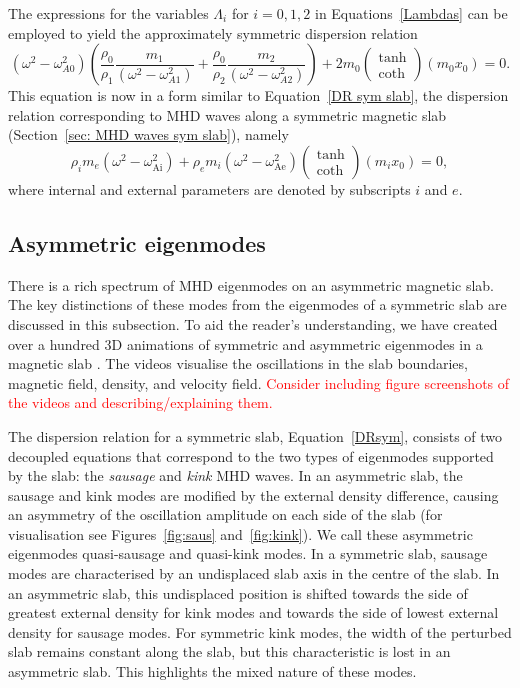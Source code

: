 \documentclass[12pt]{../style-files/ociamthesis}
\begin{document}
The expressions for the variables $\Lambda_i$ for $i=0,1,2$ in Equations~\eqref{Lambdas} can be employed to yield the approximately symmetric dispersion relation
\begin{equation}
(\omega^2 - \omega_{A0}^2)\left(\frac{\rho_0}{\rho_1}\frac{m_1}{(\omega^2 - \omega_{A1}^2)} + \frac{\rho_0}{\rho_2}\frac{m_2}{(\omega^2 - \omega_{A2}^2)}\right) + 2m_0\left(\begin{matrix}\tanh \\ \coth \end{matrix}\right)(m_0x_0) = 0. \label{DR approx}
\end{equation}
This equation is now in a form similar to Equation~\eqref{DR sym slab}, the dispersion relation corresponding to MHD waves along a symmetric magnetic slab (Section~\ref{sec: MHD waves sym slab}), namely
\begin{equation}
\rho_im_e(\omega^2 - \omega_\textrm{Ai}^2) + \rho_em_i(\omega^2 - \omega_\textrm{Ae}^2)\left(\begin{matrix}\tanh \\ \coth \end{matrix}\right)(m_ix_0) = 0, \label{DRsym}
\end{equation}
where internal and external parameters are denoted by subscripts $i$ and $e$.


\subsection{Asymmetric eigenmodes}
There is a rich spectrum of MHD eigenmodes on an asymmetric magnetic slab. The key distinctions of these modes from the eigenmodes of a symmetric slab are discussed in this subsection. To aid the reader's understanding, we have created over a hundred 3D animations of symmetric and asymmetric eigenmodes in a magnetic slab \cite{all_etal18c}. The videos visualise the oscillations in the slab boundaries, magnetic field, density, and velocity field. \textcolor{red}{Consider including figure screenshots of the videos and describing/explaining them.}

The dispersion relation for a symmetric slab, Equation~\eqref{DRsym}, consists of two decoupled equations that correspond to the two types of eigenmodes supported by the slab: the \textit{sausage} and \textit{kink} MHD waves. In an asymmetric slab, the sausage and kink modes are modified by the external density difference, causing an asymmetry of the oscillation amplitude on each side of the slab (for visualisation see Figures~\ref{fig:saus} and~\ref{fig:kink}). We call these asymmetric eigenmodes quasi-sausage and quasi-kink modes. In a symmetric slab, sausage modes are characterised by an undisplaced slab axis in the centre of the slab. In an asymmetric slab, this undisplaced position is shifted towards the side of greatest external density for kink modes and towards the side of lowest external density for sausage modes. For symmetric kink modes, the width of the perturbed slab remains constant along the slab, but this characteristic is lost in an asymmetric slab. This highlights the mixed nature of these modes. 
\end{document}
